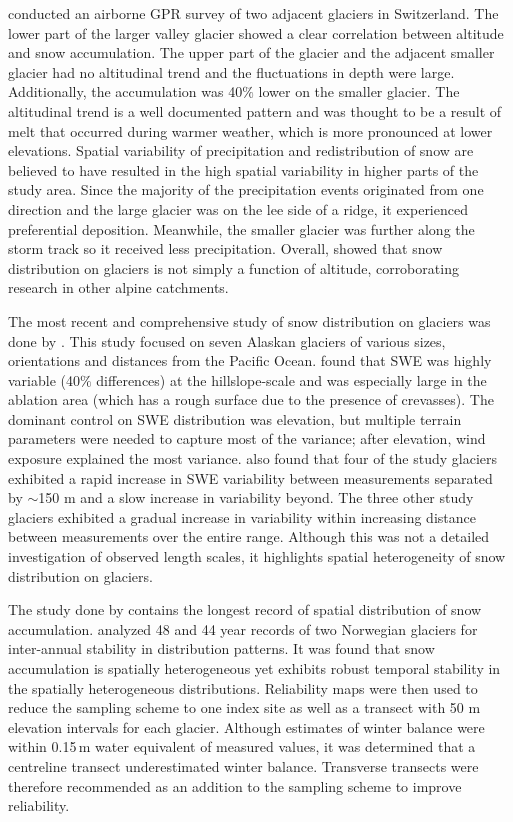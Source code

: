 \documentclass{sfuthesis}
\begin{document}
\cite{Machguth2006} conducted an airborne GPR survey of two adjacent glaciers in Switzerland. The lower part of the larger valley glacier showed a clear correlation between altitude and snow accumulation. The upper part of the glacier and the adjacent smaller glacier had no altitudinal trend and the fluctuations in depth were large. Additionally, the accumulation was 40$\%$ lower on the smaller glacier. The altitudinal trend is a well documented pattern and was thought to be a result of melt that occurred during warmer weather, which is more pronounced at lower elevations. Spatial variability of precipitation and redistribution of snow are believed to have resulted in the high spatial variability in higher parts of the study area. Since the majority of the precipitation events originated from one direction and the large glacier was on the lee side of a ridge, it experienced preferential deposition. Meanwhile, the smaller glacier was further along the storm track so it received less precipitation. Overall, \cite{Machguth2006} showed that snow distribution on glaciers is not simply a function of altitude, corroborating research in other alpine catchments.

The most recent and comprehensive study of snow distribution on glaciers was done by \cite{McGrath2015}. This study focused on seven Alaskan glaciers of various sizes, orientations and distances from the Pacific Ocean. \cite{McGrath2015} found that SWE was highly variable (40$\%$ differences) at the hillslope-scale and was especially large in the ablation area (which has a rough surface due to the presence of crevasses). The dominant control on SWE distribution was elevation, but multiple terrain parameters were needed to capture most of the variance; after elevation, wind exposure explained the most variance. \cite{McGrath2015} also found that four of the study glaciers exhibited a rapid increase in SWE variability between measurements separated by $\sim$150 m and a slow increase in variability beyond. The three other study glaciers exhibited a gradual increase in variability within increasing distance between measurements over the entire range. Although this was not a detailed investigation of observed length scales, it highlights spatial heterogeneity of snow distribution on glaciers.

The study done by \cite{Walmsley2015} contains the longest record of spatial distribution of snow accumulation. \cite{Walmsley2015} analyzed 48 and 44 year records of two Norwegian glaciers for inter-annual stability in distribution patterns. It was found that snow accumulation is spatially heterogeneous yet exhibits robust temporal stability in the spatially heterogeneous distributions. Reliability maps were then used to reduce the sampling scheme to one index site as well as a transect with 50 m elevation intervals for each glacier. Although estimates of winter balance were within 0.15\,m water equivalent of measured values, it was determined that a centreline transect underestimated winter balance. Transverse transects were therefore recommended as an addition to the sampling scheme to improve reliability.
\end{document}
